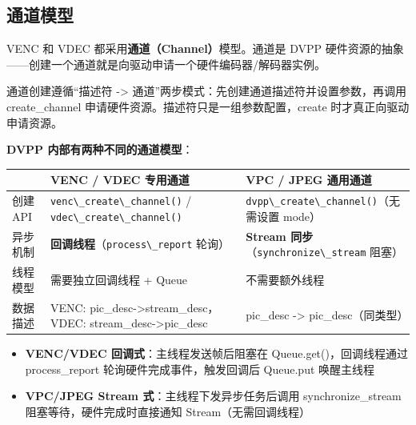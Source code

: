 \subsection{通道模型}\label{channel-model}

VENC 和 VDEC 都采用\textbf{通道（Channel）}模型。通道是 DVPP
硬件资源的抽象------创建一个通道就是向驱动申请一个硬件编码器/解码器实例。

通道创建遵循``描述符 -\textgreater{}
通道''两步模式：先创建通道描述符并设置参数，再调用 create\_channel
申请硬件资源。描述符只是一组参数配置，create 时才真正向驱动申请资源。

\textbf{DVPP 内部有两种不同的通道模型}：

\begin{longtable}[]{@{}
  >{\raggedright\arraybackslash}p{}
  >{\raggedright\arraybackslash}p{}
  >{\raggedright\arraybackslash}p{}@{}}
\toprule\noalign{}
\begin{minipage}[b]{\linewidth}\raggedright
\end{minipage} & \begin{minipage}[b]{\linewidth}\raggedright
VENC / VDEC 专用通道
\end{minipage} & \begin{minipage}[b]{\linewidth}\raggedright
VPC / JPEG 通用通道
\end{minipage} \\
\midrule\noalign{}
\endhead
\bottomrule\noalign{}
\endlastfoot
创建 API & \passthrough{\lstinline!venc\_create\_channel()!} /
\passthrough{\lstinline!vdec\_create\_channel()!} &
\passthrough{\lstinline!dvpp\_create\_channel()!}（无需设置 mode） \\
异步机制 & \textbf{回调线程}（\passthrough{\lstinline!process\_report!}
轮询） & \textbf{Stream
同步}（\passthrough{\lstinline!synchronize\_stream!} 阻塞） \\
线程模型 & 需要独立回调线程 + Queue & 不需要额外线程 \\
数据描述 & VENC: pic\_desc-\textgreater stream\_desc，VDEC:
stream\_desc-\textgreater pic\_desc & pic\_desc -\textgreater{}
pic\_desc（同类型） \\
\end{longtable}

\begin{itemize}
\tightlist
\item
  \textbf{VENC/VDEC 回调式}：主线程发送帧后阻塞在
  Queue.get()，回调线程通过 process\_report 轮询硬件完成事件，触发回调后
  Queue.put 唤醒主线程
\item
  \textbf{VPC/JPEG Stream 式}：主线程下发异步任务后调用
  synchronize\_stream 阻塞等待，硬件完成时直接通知
  Stream（无需回调线程）
\end{itemize}

